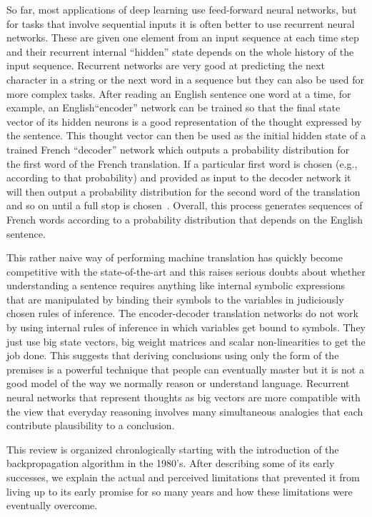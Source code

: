 \documentclass[]{article}
\begin{document}
So far, most applications of deep learning use feed-forward neural
networks, but for tasks that involve sequential inputs it is often better
to use recurrent neural networks. These are given one element from an input %
sequence at each time step and their recurrent internal ``hidden'' state
depends on the whole history of the input sequence. Recurrent networks are
very good at predicting the next character in a string\cite{Sutskever} or
the next word in a sequence\cite{Mikolov} but they can also be used for
more complex tasks.  After reading an English sentence one word at a time,
for example, an English``encoder'' network can be trained so that the final
state vector of its hidden neurons is a good representation of the thought
expressed by the sentence.  This thought vector can then be used as the
initial hidden state of a trained French ``decoder'' network which outputs
a probability distribution for the first word of the French translation. If
a particular first word is chosen (e.g., according to that probability)
and provided as input to the decoder
network it will then output a probability distribution for the second word
of the translation and so on until a full stop is chosen~\cite{Vinyals,
  Montreal}. 
Overall, this process generates sequences of French words according to
a probability distribution that depends on the English sentence.

This rather naive way of performing machine translation has quickly become
competitive with the state-of-the-art and this raises serious doubts about
whether understanding a sentence requires anything like internal symbolic
expressions that are manipulated by binding their symbols to the variables
in judiciously chosen rules of inference.  The encoder-decoder translation
networks do not work by using internal rules of inference in which
variables get bound to symbols. They just use big state vectors, big weight
matrices and scalar non-linearities to get the job done.  This suggests
that deriving conclusions using only the form of the premises is a powerful
technique that people can eventually master but it is not a good model of
the way we normally reason or understand language. Recurrent neural
networks that represent thoughts as big vectors are more compatible with
the view that everyday reasoning involves many simultaneous analogies that
each contribute plausibility to a conclusion\cite{metaphors}.

This review is organized chronlogically starting with the introduction of
the backpropagation algorithm in the 1980's. After describing some of its
early successes, we explain the actual and perceived limitations that
prevented it from living up to its early promise for so many years and how
these limitations were eventually overcome.
\end{document}
